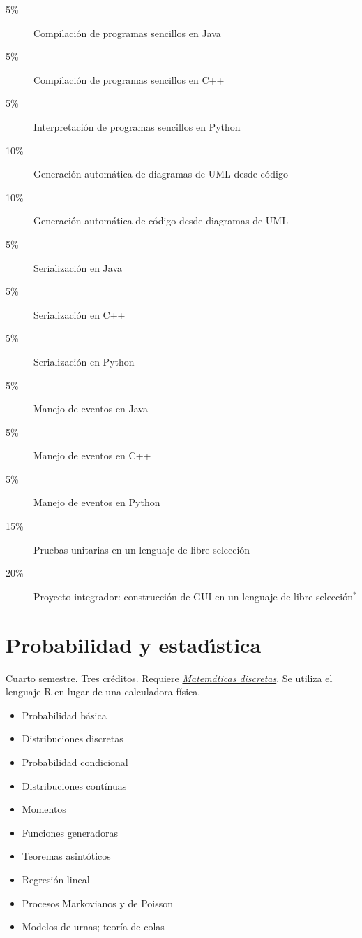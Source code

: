 \documentclass{article}
\begin{document}
\begin{multicols}{4}
\begin{description}
\item[5\%]{Compilaci\'{o}n de programas sencillos en Java}
\item[5\%]{Compilaci\'{o}n de programas sencillos en C++}
\item[5\%]{Interpretaci\'{o}n de programas sencillos en Python}  
\item[10\%]{Generaci\'{o}n autom\'{a}tica de diagramas de UML desde
  c\'{o}digo}
\item[10\%]{Generaci\'{o}n autom\'{a}tica de c\'{o}digo desde
  diagramas de UML}
\item[5\%]{Serializaci\'{o}n en Java}
\item[5\%]{Serializaci\'{o}n en C++}
\item[5\%]{Serializaci\'{o}n en Python}
\item[5\%]{Manejo de eventos en Java}
\item[5\%]{Manejo de eventos en C++}
\item[5\%]{Manejo de eventos en Python}
\item[15\%]{Pruebas unitarias en un lenguaje de libre selecci\'{o}n}
\item[20\%]{Proyecto integrador: construcci\'{o}n de GUI en un
  lenguaje de libre selecci\'{o}n$^\ast$}
\end{description}

\newpage

\hypertarget{pye}{\section*{Probabilidad y estad\'{\i}stica }}

Cuarto semestre. Tres cr\'{e}ditos. Requiere \hyperlink{md}{\em
  Matem\'{a}ticas discretas}. Se utiliza el lenguaje R en lugar de una
calculadora f\'{i}sica.

\begin{itemize}
\item{Probabilidad b\'{a}sica}
\item{Distribuciones discretas}
\item{Probabilidad condicional}
\item{Distribuciones cont\'{i}nuas}
\item{Momentos}
\item{Funciones generadoras}
\item{Teoremas asint\'{o}ticos}
\item{Regresi\'{o}n lineal}
\item{Procesos Markovianos y de Poisson}    
\item{Modelos de urnas; teor\'{i}a de colas}  
\end{itemize}


\end{multicols}
\end{document}
